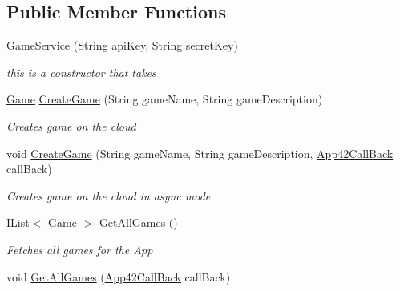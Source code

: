 \subsection*{Public Member Functions}
\begin{DoxyCompactItemize}
\item 
\hyperlink{classcom_1_1shephertz_1_1app42_1_1paas_1_1sdk_1_1csharp_1_1game_1_1_game_service_afd2aead39ced753ef2552e8dfbc38764}{Game\+Service} (String api\+Key, String secret\+Key)
\begin{DoxyCompactList}\small\item\em this is a constructor that takes \end{DoxyCompactList}\item 
\hyperlink{classcom_1_1shephertz_1_1app42_1_1paas_1_1sdk_1_1csharp_1_1game_1_1_game}{Game} \hyperlink{classcom_1_1shephertz_1_1app42_1_1paas_1_1sdk_1_1csharp_1_1game_1_1_game_service_ae3a6a649bd570bedd152c2dc3fa19f2f}{Create\+Game} (String game\+Name, String game\+Description)
\begin{DoxyCompactList}\small\item\em Creates game on the cloud \end{DoxyCompactList}\item 
void \hyperlink{classcom_1_1shephertz_1_1app42_1_1paas_1_1sdk_1_1csharp_1_1game_1_1_game_service_a8b17b42126b6e8927a0c377667142bc1}{Create\+Game} (String game\+Name, String game\+Description, \hyperlink{interfacecom_1_1shephertz_1_1app42_1_1paas_1_1sdk_1_1csharp_1_1_app42_call_back}{App42\+Call\+Back} call\+Back)
\begin{DoxyCompactList}\small\item\em Creates game on the cloud in async mode \end{DoxyCompactList}\item 
I\+List$<$ \hyperlink{classcom_1_1shephertz_1_1app42_1_1paas_1_1sdk_1_1csharp_1_1game_1_1_game}{Game} $>$ \hyperlink{classcom_1_1shephertz_1_1app42_1_1paas_1_1sdk_1_1csharp_1_1game_1_1_game_service_a44ff8bfd752812bcb22d07797b0776aa}{Get\+All\+Games} ()
\begin{DoxyCompactList}\small\item\em Fetches all games for the App \end{DoxyCompactList}\item 
void \hyperlink{classcom_1_1shephertz_1_1app42_1_1paas_1_1sdk_1_1csharp_1_1game_1_1_game_service_a3e8d721ec3063222d2afa03d99469d23}{Get\+All\+Games} (\hyperlink{interfacecom_1_1shephertz_1_1app42_1_1paas_1_1sdk_1_1csharp_1_1_app42_call_back}{App42\+Call\+Back} call\+Back)

\end{DoxyCompactItemize}
